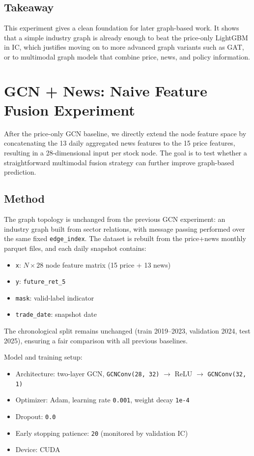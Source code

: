 \subsection{Takeaway}

This experiment gives a clean foundation for later graph-based work. It shows that a simple industry graph is already enough to beat the price-only LightGBM in IC, which justifies moving on to more advanced graph variants such as GAT, or to multimodal graph models that combine price, news, and policy information.

\section{GCN + News: Naive Feature Fusion Experiment}

After the price-only GCN baseline, we directly extend the node feature space by concatenating the 13 daily aggregated news features to the 15 price features, resulting in a 28-dimensional input per stock node. The goal is to test whether a straightforward multimodal fusion strategy can further improve graph-based prediction.

\subsection{Method}

The graph topology is unchanged from the previous GCN experiment: an industry graph built from sector relations, with message passing performed over the same fixed \texttt{edge\_index}. The dataset is rebuilt from the price+news monthly parquet files, and each daily snapshot contains:
\begin{itemize}
\item \texttt{x}: $N \times 28$ node feature matrix (15 price + 13 news)
\item \texttt{y}: \texttt{future\_ret\_5}
\item \texttt{mask}: valid-label indicator
\item \texttt{trade\_date}: snapshot date
\end{itemize}

The chronological split remains unchanged (train 2019--2023, validation 2024, test 2025), ensuring a fair comparison with all previous baselines.

Model and training setup:
\begin{itemize}
\item Architecture: two-layer GCN, \texttt{GCNConv(28, 32)} $\rightarrow$ ReLU $\rightarrow$ \texttt{GCNConv(32, 1)}
\item Optimizer: Adam, learning rate \texttt{0.001}, weight decay \texttt{1e-4}
\item Dropout: \texttt{0.0}
\item Early stopping patience: \texttt{20} (monitored by validation IC)
\item Device: CUDA
\end{itemize}


